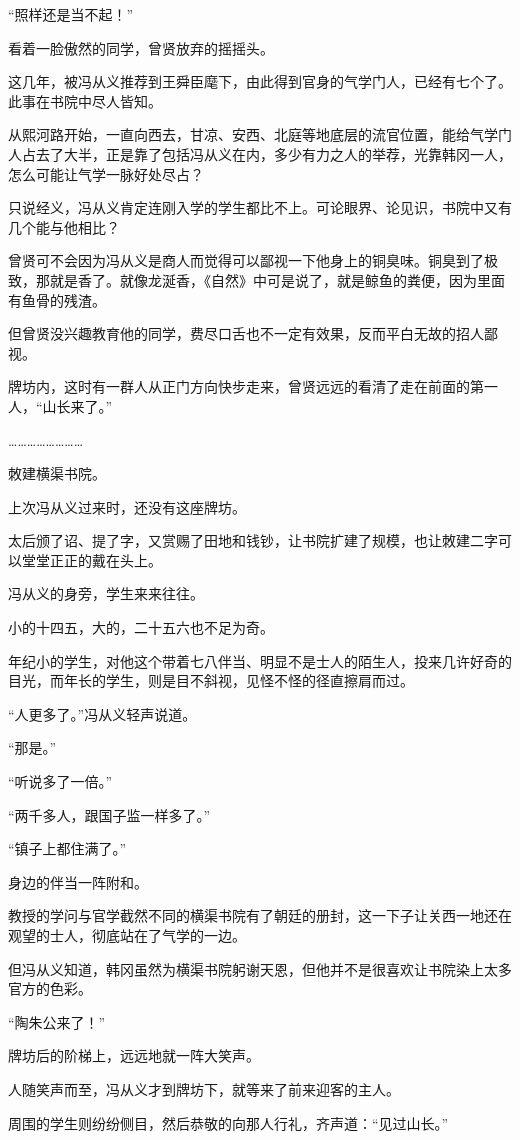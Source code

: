 “照样还是当不起！”

看着一脸傲然的同学，曾贤放弃的摇摇头。

这几年，被冯从义推荐到王舜臣麾下，由此得到官身的气学门人，已经有七个了。此事在书院中尽人皆知。

从熙河路开始，一直向西去，甘凉、安西、北庭等地底层的流官位置，能给气学门人占去了大半，正是靠了包括冯从义在内，多少有力之人的举荐，光靠韩冈一人，怎么可能让气学一脉好处尽占？

只说经义，冯从义肯定连刚入学的学生都比不上。可论眼界、论见识，书院中又有几个能与他相比？

曾贤可不会因为冯从义是商人而觉得可以鄙视一下他身上的铜臭味。铜臭到了极致，那就是香了。就像龙涎香，《自然》中可是说了，就是鲸鱼的粪便，因为里面有鱼骨的残渣。

但曾贤没兴趣教育他的同学，费尽口舌也不一定有效果，反而平白无故的招人鄙视。

牌坊内，这时有一群人从正门方向快步走来，曾贤远远的看清了走在前面的第一人，“山长来了。”

……………………

敇建横渠书院。

上次冯从义过来时，还没有这座牌坊。

太后颁了诏、提了字，又赏赐了田地和钱钞，让书院扩建了规模，也让敇建二字可以堂堂正正的戴在头上。

冯从义的身旁，学生来来往往。

小的十四五，大的，二十五六也不足为奇。

年纪小的学生，对他这个带着七八伴当、明显不是士人的陌生人，投来几许好奇的目光，而年长的学生，则是目不斜视，见怪不怪的径直擦肩而过。

“人更多了。”冯从义轻声说道。

“那是。”

“听说多了一倍。”

“两千多人，跟国子监一样多了。”

“镇子上都住满了。”

身边的伴当一阵附和。

教授的学问与官学截然不同的横渠书院有了朝廷的册封，这一下子让关西一地还在观望的士人，彻底站在了气学的一边。

但冯从义知道，韩冈虽然为横渠书院躬谢天恩，但他并不是很喜欢让书院染上太多官方的色彩。

“陶朱公来了！”

牌坊后的阶梯上，远远地就一阵大笑声。

人随笑声而至，冯从义才到牌坊下，就等来了前来迎客的主人。

周围的学生则纷纷侧目，然后恭敬的向那人行礼，齐声道：“见过山长。”

